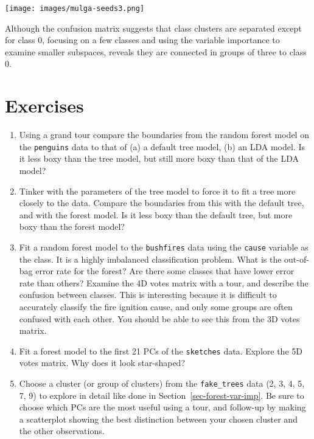 \documentclass[
  letterpaper,
]{krantz}
\providecommand{\tightlist}{%
  \setlength{\itemsep}{0pt}\setlength{\parskip}{0pt}}\usepackage{longtable,booktabs,array}
\newcommand{\insightbox}[1]{%
\noindent\colorbox{insight!30}{%
\begin{minipage}{0.98\textwidth}%
    \centering%
    \begin{minipage}[c]{0.15\textwidth} %
      \texttt{[image: images/mulga-seeds3.png]} %
    \end{minipage}%
    \hfill %
    \begin{minipage}[c]{0.8\textwidth} %
      \bigskip%
      \textsf{#1}%
      \bigskip%
    \end{minipage}%
    \hspace*{3mm}%
  \end{minipage}%
}%
}
\begin{document}
\insightbox{Although the confusion matrix suggests that class clusters are separated except for class 0, focusing on a few classes and using the variable importance to examine smaller subspaces, reveals they are connected in groups of three to class 0.}

\section*{Exercises}\label{exercises-14}


\begin{enumerate}
\def\labelenumi{\arabic{enumi}.}
\tightlist
\item
  Using a grand tour compare the boundaries from the random forest model
  on the \texttt{penguins} data to that of (a) a default tree model, (b)
  an LDA model. Is it less boxy than the tree model, but still more boxy
  than that of the LDA model?
\item
  Tinker with the parameters of the tree model to force it to fit a tree
  more closely to the data. Compare the boundaries from this with the
  default tree, and with the forest model. Is it less boxy than the
  default tree, but more boxy than the forest model?
\item
  Fit a random forest model to the \texttt{bushfires} data using the
  \texttt{cause} variable as the class. It is a highly imbalanced
  classification problem. What is the out-of-bag error rate for the
  forest? Are there some classes that have lower error rate than others?
  Examine the 4D votes matrix with a tour, and describe the confusion
  between classes. This is interesting because it is difficult to
  accurately classify the fire ignition cause, and only some groups are
  often confused with each other. You should be able to see this from
  the 3D votes matrix.
\item
  Fit a forest model to the first 21 PCs of the \texttt{sketches} data.
  Explore the 5D votes matrix. Why does it look star-shaped?
\item
  Choose a cluster (or group of clusters) from the \texttt{fake\_trees}
  data (2, 3, 4, 5, 7, 9) to explore in detail like done in
  Section~\ref{sec-forest-var-imp}. Be sure to choose which PCs are the
  most useful using a tour, and follow-up by making a scatterplot
  showing the best distinction between your chosen cluster and the other
  observations.
\end{enumerate}
\end{document}
